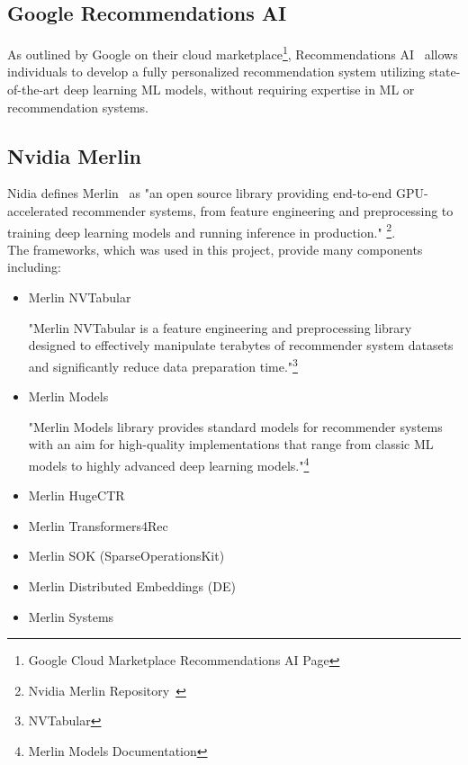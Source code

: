 \subsection{Google Recommendations AI}
As outlined by Google on their cloud marketplace\footnote{Google Cloud Marketplace Recommendations AI Page\cite{GoogleMarketplaceRecAi}}, Recommendations AI~\cite{GoogleRecommendationsAI} allows individuals to develop a fully personalized recommendation system utilizing state-of-the-art deep learning ML models, without requiring expertise in ML or recommendation systems. \\

\subsection{Nvidia Merlin}

Nidia defines Merlin~\cite{NvidiaMerlin} as "an open source library providing end-to-end GPU-accelerated recommender systems, from feature engineering and preprocessing to training deep learning models and running inference in production." \footnote{Nvidia Merlin Repository~\cite{NvidiaMerlinRepo}}. 
\\The frameworks, which was used in this project, provide many components including:
\begin{itemize}
    \item Merlin NVTabular~\cite{MerlinNVTabular}
    \begin{displayquote}
    "Merlin NVTabular is a feature engineering and preprocessing library designed to effectively manipulate terabytes of recommender system datasets and significantly reduce data preparation time."\footnote{NVTabular\cite{MerlinNVTabular}}
    \end{displayquote}
    \item Merlin Models~\cite{MerlinModels}
    \begin{displayquote}
    "Merlin Models library provides standard models for recommender systems with an aim for high-quality implementations that range from classic ML models to highly advanced deep learning models."\footnote{Merlin Models Documentation\cite{MerlinModelsDocs}}
    \end{displayquote}
    \item Merlin HugeCTR~\cite{MerlinHugeCTR}
    \item Merlin Transformers4Rec~\cite{MerlinTransformer4Rec}
    \item Merlin SOK (SparseOperationsKit)
    \item Merlin Distributed Embeddings (DE)
    \item Merlin Systems~\cite{MerlinSystemsRepo}
\end{itemize}

